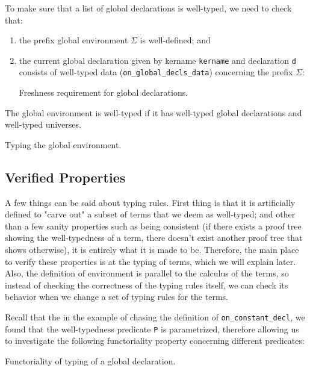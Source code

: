To make sure that a list of global declarations is well-typed, we need to check that:
\begin{enumerate}
  \item the prefix global environment $\Sigma$ is well-defined; and
  \item the current global declaration given by kername \verb|kername| and
  declaration \verb|d| consists of well-typed data
  (\verb|on_global_decls_data|) concerning the prefix $\Sigma$:

\begin{listing}[H]
  \caption{Freshness requirement for global declarations.}
  \label{lst:1-typ-fresh}
\end{listing}

\end{enumerate}

The global environment is well-typed if it has well-typed global declarations
and well-typed universes.

\begin{listing}[H]
  \caption{Typing the global environment.}
  \label{lst:1-typ-env}
\end{listing}

\subsection*{Verified Properties}
A few things can be said about typing rules. First thing is that it is
artificially defined to "carve out" a subset of terms that we deem as
well-typed; and other than a few sanity properties such as being consistent (if
there exists a proof tree showing the well-typedness of a term, there doesn't
exist another proof tree that shows otherwise), it is entirely what it is made
to be. Therefore, the main place to verify these properties is at the typing of
terms, which we will explain later. Also, the definition of environment is
parallel to the calculus of the terms, so instead of checking the correctness of
the typing rules itself, we can check its behavior when we change a set of
typing rules for the terms.

Recall that the in the example of chasing the definition of
\verb|on_constant_decl|, we found that the well-typedness predicate \verb|P| is
parametrized, therefore allowing us to investigate the following functoriality
property concerning different predicates:

\begin{listing}[H]
  \caption{Functoriality of typing of a global declaration.}
  \label{lst:1-typ-funct}
\end{listing}

